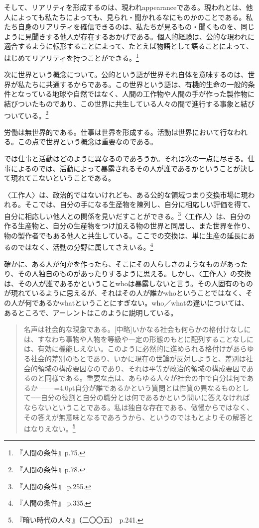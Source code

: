 \documentclass[b5j,twoside,twocolumn]{utarticle}
\begin{document}
そして、リアリティを形成するのは、現われappearanceである。現われとは、他人によっても私たちによっても、見られ・聞かれるなにものかのことである。私たち自身のリアリティを確信できるのは、私たちが見るもの・聞くものを、同じように見聞きする他人が存在するおかげである。個人的経験は、公的な現われに適合するように転形することによって、たとえば物語として語ることによって、はじめてリアリティを持つことができる。\footnote{『人間の条件』p.75.}


次に世界という概念について。公的という語が世界それ自体を意味するのは、世界が私たちに共通するからである。この世界という語は、有機的生命の一般的条件となっている地球や自然ではなく、人間の工作物や人間の手が作った製作物に結びついたものであり、この世界に共生している人々の間で進行する事象と結びついている。\footnote{『人間の条件』p.78.}


労働は無世界的である。仕事は世界を形成する。活動は世界において行なわれる。この点で世界という概念は重要なのである。


では仕事と活動はどのように異なるのであろうか。それは次の一点に尽きる。仕事によるのでは、活動によって暴露されるその人が誰であるかということが決して現れてこないということである。


〈工作人〉は、政治的ではないけれども、ある公的な領域つまり交換市場に現われる。そこでは、自分の手になる生産物を陳列し、自分に相応しい評価を得て、自分に相応しい他人との関係を見いだすことができる。\footnote{『人間の条件』 p.255.}〈工作人〉は、自分の作る生産物と、自分の生産物をつけ加える物の世界と同居し、また世界を作り、物の製作者でもある他人と共生している。ここでの交換は、単に生産の延長にあるのではなく、活動の分野に属してさえいる。\footnote{『人間の条件』 p.335.}


確かに、ある人が何かを作ったら、そこにその人らしさのようなものがあったり、その人独自のものがあったりするように思える。しかし、〈工作人〉の交換は、その人が誰であるかということwhoは暴露しないと言う。その人固有のものが現れているように思えるが、それはその人が誰かwhoということではなく、その人が何であるかwhatということにすぎない。who／whatの違いについては、あるところで、アーレントはこのように説明している。
\begin{quote}
名声は社会的な現象である。[中略]いかなる社会も何らかの格付けなしには、すなわち事物や人物を等級や一定の形態のもとに配列することなしには、有効に機能しえない。このように必然的に進められる格付けがあらゆる社会的差別のもとであり、いかに現在の世論が反対しようと、差別は社会的領域の構成要因なのであり、それは平等が政治的領域の構成要因であるのと同様である。重要な点は、あらゆる人々が社会の中で自分は何であるか\tbaselineshift =2.5pt ------\tbaselineshift =4.0pt自分が誰であるかという質問とは性質の異なるものとして──自分の役割と自分の職分とは何であるかという問いに答えなければならないということである。私は独自な存在である、傲慢からではなく、その答えが無意味となるであろうから、というのではもとよりその解答とはなりえない。\footnote{『暗い時代の人々』（二〇〇五） p.241.}
\end{quote}
\end{document}
